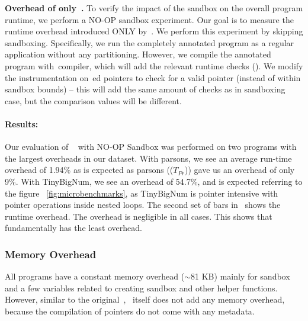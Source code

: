 \noindent\textbf{Overhead of only~\systemname{}.}
To verify the impact of the sandbox on the overall program runtime, we perform a NO-OP sandbox experiment.
Our goal is to measure the runtime overhead introduced ONLY by~\systemname{}.
We perform this experiment by skipping sandboxing.
Specifically, we run the completely annotated program as a regular application without any partitioning.
However, we compile the annotated program with~\systemname compiler, which will add the relevant runtime checks ().
We modify the instrumentation on~ed pointers to check for a valid pointer (instead of within sandbox bounds) -- this will add the same amount of checks as in sandboxing case, but the comparison values will be different.
~\paragraph{Results:}
Our evaluation of ~\systemname{} with NO-OP Sandbox was performed on two programs with the largest overheads in our dataset. With parsons, we see an average run-time overhead of 1.94\% as is expected as parsons (($T_{Pr}$)) gave us an overhead of only 9\%. With TinyBigNum, we see an overhead of 54.7\%, and is expected referring to the figure ~\ref{fig:microbenchmarks}, as TinyBigNum is pointer intensive with pointer operations inside nested loops.     
The second set of bars in~ shows the runtime overhead. The overhead is negligible in all cases.
This shows that~\systemname{} fundamentally has the least overhead.



\subsubsection{Memory Overhead}
All programs have a constant memory overhead ($\sim$81 KB) mainly for sandbox and a few variables related to creating sandbox and other helper functions.
However, similar to the original~\checkedc,~\systemname{} itself does not add any memory overhead,
because the compilation of  pointers do not come with any metadata.

